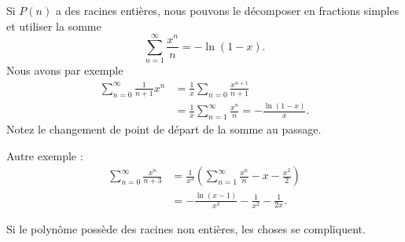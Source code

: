 Si \( P(n)\) a des racines entières, nous pouvons le décomposer en fractions simples et utiliser la somme
\begin{equation}
    \sum_{n=1}^{\infty}\frac{ x^n }{ n }=-\ln(1-x).
\end{equation}
Nous avons par exemple
\begin{subequations}
    \begin{align}
        \sum_{n=0}^{\infty}\frac{1}{ n+1 }x^n&=\frac{1}{ x }\sum_{n=0}\frac{ x^{n+1} }{ n+1 }\\
        &=\frac{1}{ x }\sum_{n=1}^{\infty}\frac{ x^n }{ n }=-\frac{ \ln(1-x) }{ x }.
    \end{align}
\end{subequations}
Notez le changement de point de départ de la somme au passage.

Autre exemple :
\begin{subequations}
    \begin{align}
        \sum_{n=0}^{\infty}\frac{ x^n }{ n+3 }&=\frac{1}{ x^3 }\left( \sum_{n=1}^{\infty}\frac{ x^n }{ n }-x-\frac{ x^2 }{ 2 } \right)\\
        &=-\frac{ \ln(x-1) }{ x^3 }-\frac{1}{ x^2 }-\frac{1}{ 2x }.
    \end{align}
\end{subequations}

Si le polynôme possède des racines non entières, les choses se compliquent. 

